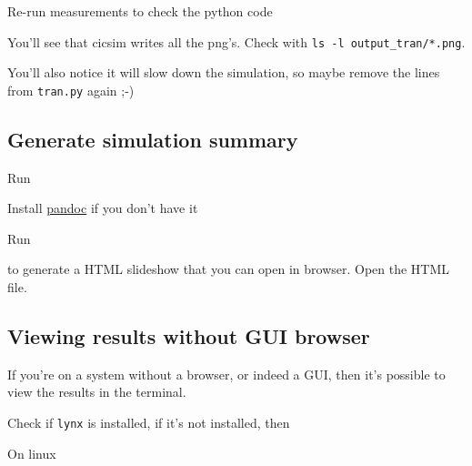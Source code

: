 Re-run measurements to check the python code

\begin{Shaded}
\begin{Highlighting}[]
\end{Highlighting}
\end{Shaded}

You'll see that cicsim writes all the png's. Check with
\texttt{ls\ -l\ output\_tran/*.png}.

You'll also notice it will slow down the simulation, so maybe remove the
lines from \texttt{tran.py} again ;-)

\subsection{Generate simulation
summary}\label{generate-simulation-summary}

Run

\begin{Shaded}
\begin{Highlighting}[]
\end{Highlighting}
\end{Shaded}

Install \href{https://pandoc.org}{pandoc} if you don't have it

Run

\begin{Shaded}
\begin{Highlighting}[]
 
\end{Highlighting}
\end{Shaded}

to generate a HTML slideshow that you can open in browser. Open the HTML
file.

\subsection{Viewing results without GUI
browser}\label{viewing-results-without-gui-browser}

If you're on a system without a browser, or indeed a GUI, then it's
possible to view the results in the terminal.

Check if \texttt{lynx} is installed, if it's not installed, then

On linux

